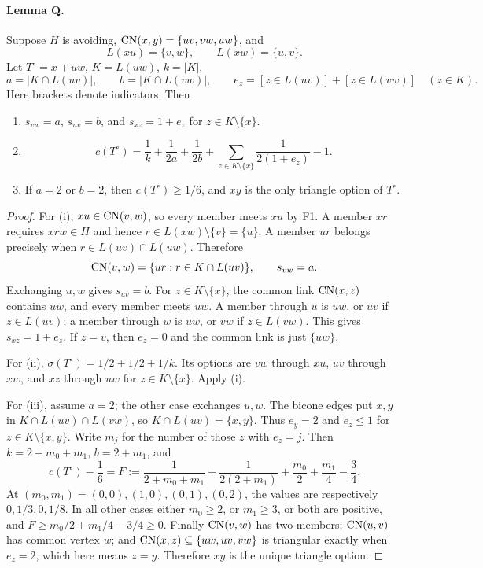 \paragraph{Lemma Q.} Suppose $H$ is avoiding, $\operatorname{CN}(x,y)=\{uv,vw,uw\}$, and
\[
 L(xu)=\{v,w\},\qquad L(xw)=\{u,v\}.
\]
Let $T^\circ=x+uw$, $K=L(uw)$, $k=|K|$,
\[
 a=|K\cap L(uv)|,\qquad b=|K\cap L(vw)|,\qquad
 e_z=[z\in L(uv)]+[z\in L(vw)]\quad(z\in K).
\]
Here brackets denote indicators. Then
\begin{enumerate}
\item[(i)] $s_{vw}=a$, $s_{uv}=b$, and $s_{xz}=1+e_z$ for $z\in K\setminus\{x\}$.
\item[(ii)]
\[
 c(T^\circ)=\frac1k+\frac1{2a}+\frac1{2b}
       +\sum_{z\in K\setminus\{x\}}\frac1{2(1+e_z)}-1.
\]
\item[(iii)] If $a=2$ or $b=2$, then $c(T^\circ)\geq1/6$, and $xy$ is the only triangle option of $T^\circ$.
\end{enumerate}
\begin{proof}
For (i), $xu\in\operatorname{CN}(v,w)$, so every member meets $xu$ by F1. A member $xr$ requires $xrw\in H$ and hence $r\in L(xw)\setminus\{v\}=\{u\}$. A member $ur$ belongs precisely when $r\in L(uv)\cap L(uw)$. Therefore
\[
 \operatorname{CN}(v,w)=\{ur:r\in K\cap L(uv)\},\qquad s_{vw}=a.
\]
Exchanging $u,w$ gives $s_{uv}=b$. For $z\in K\setminus\{x\}$, the common link $\operatorname{CN}(x,z)$ contains $uw$, and every member meets $uw$. A member through $u$ is $uw$, or $uv$ if $z\in L(uv)$; a member through $w$ is $uw$, or $vw$ if $z\in L(vw)$. This gives $s_{xz}=1+e_z$. If $z=v$, then $e_z=0$ and the common link is just $\{uw\}$.

For (ii), $\sigma(T^\circ)=1/2+1/2+1/k$. Its options are $vw$ through $xu$, $uv$ through $xw$, and $xz$ through $uw$ for $z\in K\setminus\{x\}$. Apply (i).

For (iii), assume $a=2$; the other case exchanges $u,w$. The bicone edges put $x,y$ in $K\cap L(uv)\cap L(vw)$, so $K\cap L(uv)=\{x,y\}$. Thus $e_y=2$ and $e_z\leq1$ for $z\in K\setminus\{x,y\}$. Write $m_j$ for the number of those $z$ with $e_z=j$. Then $k=2+m_0+m_1$, $b=2+m_1$, and
\[
 c(T^\circ)-\frac16=F:=\frac1{2+m_0+m_1}
 +\frac1{2(2+m_1)}+\frac{m_0}2+\frac{m_1}4-\frac34.
\]
At $(m_0,m_1)=(0,0),(1,0),(0,1),(0,2)$, the values are respectively $0,1/3,0,1/8$. In all other cases either $m_0\geq2$, or $m_1\geq3$, or both are positive, and
$F\geq m_0/2+m_1/4-3/4\geq0$.
Finally $\operatorname{CN}(v,w)$ has two members; $\operatorname{CN}(u,v)$ has common vertex $w$; and $\operatorname{CN}(x,z)\subseteq\{uw,uv,vw\}$ is triangular exactly when $e_z=2$, which here means $z=y$. Therefore $xy$ is the unique triangle option.
\end{proof}
